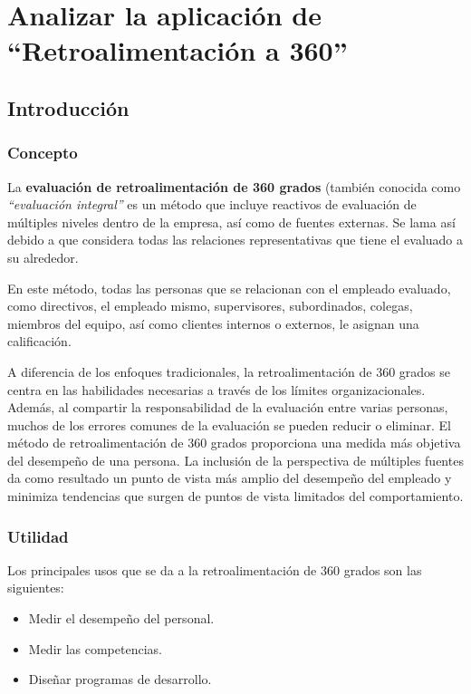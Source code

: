   

  
\newpage

\section{Analizar la aplicación de \textbf{``Retroalimentación a 360''} } %

\subsection{Introducción}

\subsubsection{Concepto}

La \textbf{evaluación de retroalimentación de 360 grados} (también conocida como \textit{``evaluación integral''} es un método que incluye reactivos de evaluación de múltiples niveles dentro de la empresa, así como de fuentes externas.
Se lama así debido a que considera todas las relaciones representativas que tiene el evaluado a su alrededor.

En este método, todas las personas que se relacionan con el empleado evaluado, como directivos, el empleado mismo, supervisores, subordinados, colegas, miembros del equipo, así como clientes internos o externos, le asignan una calificación.

A diferencia de los enfoques tradicionales, la retroalimentación de 360 grados se centra en las habilidades necesarias a través de los límites organizacionales.
Además, al compartir la responsabilidad de la evaluación entre varias personas, muchos de los errores comunes de la evaluación se pueden reducir o eliminar.
El método de retroalimentación de 360 grados proporciona una medida más objetiva del desempeño de una persona.
La inclusión de la perspectiva de múltiples fuentes da como resultado un punto de vista más amplio del desempeño del empleado y minimiza tendencias que surgen de puntos de vista limitados del comportamiento.


\subsubsection{Utilidad}

Los principales usos que se da a la retroalimentación de 360 grados son las siguientes:

\begin{itemize}
    \item Medir el desempeño del personal.
    \item Medir las competencias.
    \item Diseñar programas de desarrollo.
\end{itemize}

